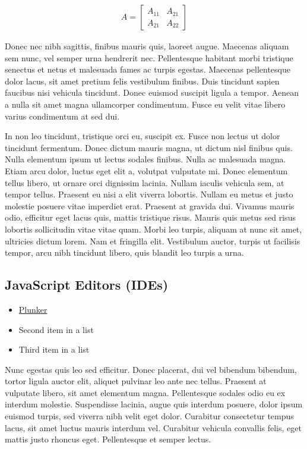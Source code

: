 \documentclass[10pt, a4paper, twocolumn]{article}
\begin{document}
\begin{align}
	A =
	\begin{bmatrix}
		A_{11} & A_{21} \\
		A_{21} & A_{22}
	\end{bmatrix}
\end{align}

Donec nec nibh sagittis, finibus mauris quis, laoreet augue. Maecenas aliquam sem nunc, vel semper urna hendrerit nec. Pellentesque habitant morbi tristique senectus et netus et malesuada fames ac turpis egestas. Maecenas pellentesque dolor lacus, sit amet pretium felis vestibulum finibus. Duis tincidunt sapien faucibus nisi vehicula tincidunt. Donec euismod suscipit ligula a tempor. Aenean a nulla sit amet magna ullamcorper condimentum. Fusce eu velit vitae libero varius condimentum at sed dui.

In non leo tincidunt, tristique orci eu, suscipit ex. Fusce non lectus ut dolor tincidunt fermentum. Donec dictum mauris magna, ut dictum nisl finibus quis. Nulla elementum ipsum ut lectus sodales finibus. Nulla ac malesuada magna. Etiam arcu dolor, luctus eget elit a, volutpat vulputate mi. Donec elementum tellus libero, ut ornare orci dignissim lacinia. Nullam iaculis vehicula sem, at tempor tellus. Praesent eu nisi a elit viverra lobortis. Nullam eu metus et justo molestie posuere vitae imperdiet erat. Praesent at gravida dui. Vivamus mauris odio, efficitur eget lacus quis, mattis tristique risus. Mauris quis metus sed risus lobortis sollicitudin vitae vitae quam. Morbi leo turpis, aliquam at nunc sit amet, ultricies dictum lorem. Nam et fringilla elit. Vestibulum auctor, turpis ut facilisis tempor, arcu nibh tincidunt libero, quis blandit leo turpis a urna.


\subsection{JavaScript Editors (IDEs)}



\begin{itemize}
	\item \href{http://plnkr.co/edit/?p=catalogue}{Plunker}
	\item Second item in a list
	\item Third item in a list
\end{itemize}

Nunc egestas quis leo sed efficitur. Donec placerat, dui vel bibendum bibendum, tortor ligula auctor elit, aliquet pulvinar leo ante nec tellus. Praesent at vulputate libero, sit amet elementum magna. Pellentesque sodales odio eu ex interdum molestie. Suspendisse lacinia, augue quis interdum posuere, dolor ipsum euismod turpis, sed viverra nibh velit eget dolor. Curabitur consectetur tempus lacus, sit amet luctus mauris interdum vel. Curabitur vehicula convallis felis, eget mattis justo rhoncus eget. Pellentesque et semper lectus.
\end{document}
